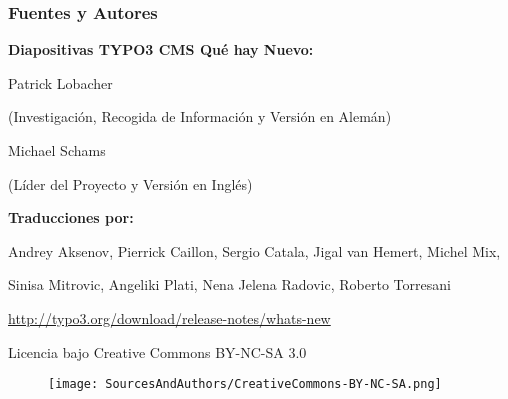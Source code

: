 \begin{frame}[fragile]
	\frametitle{Fuentes y Autores}

	\vspace{-0.6cm}

	\centerline{\textbf{Diapositivas TYPO3 CMS Qué hay Nuevo:}}

	\begin{center}
		\smaller
			\centerline{Patrick Lobacher}
			\centerline{(Investigación, Recogida de Información y Versión en Alemán)}
			\vspace{0.1cm}
			\centerline{Michael Schams}
			\centerline{(Líder del Proyecto y Versión en Inglés)}
		\normalsize
	\end{center}
	\vspace{-0.6cm}
	\begin{center}
		\smaller
			\centerline{\textbf{Traducciones por:}}
			\centerline{Andrey Aksenov, Pierrick Caillon, Sergio Catala, Jigal van Hemert, Michel Mix,}
			\centerline{Sinisa Mitrovic, Angeliki Plati, Nena Jelena Radovic, Roberto Torresani}
		\normalsize
	\end{center}
	\vspace{-0.6cm}
	\smaller\begin{center}\url{http://typo3.org/download/release-notes/whats-new}\end{center}\normalsize

	\smaller\begin{center}Licencia bajo Creative Commons BY-NC-SA 3.0\end{center}\normalsize
	\begin{figure}\vspace*{-0.3cm}
		\texttt{[image: SourcesAndAuthors/CreativeCommons-BY-NC-SA.png]}
	\end{figure}

\end{frame}

